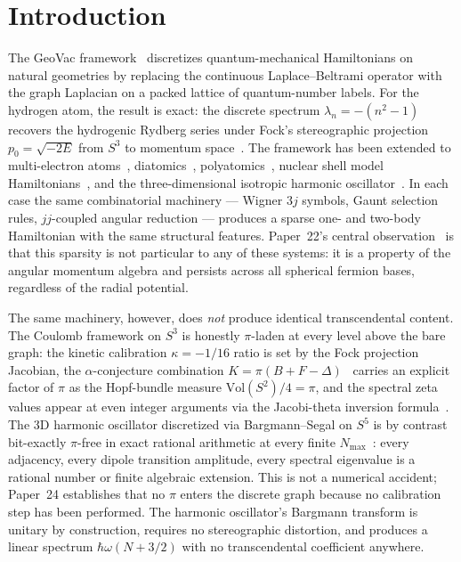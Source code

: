 \documentclass[twocolumn,pra,amsmath,amssymb,superscriptaddress]{revtex4-2}
\begin{document}
\maketitle

\section{Introduction}
\label{sec:intro}

The GeoVac framework~\cite{paper0,paper1,paper7} discretizes
quantum-mechanical Hamiltonians on natural geometries by replacing
the continuous Laplace--Beltrami operator with the graph Laplacian
on a packed lattice of quantum-number labels.  For the hydrogen atom,
the result is exact: the discrete spectrum $\lambda_n = -(n^2 - 1)$
recovers the hydrogenic Rydberg series under Fock's stereographic
projection $p_0 = \sqrt{-2E}$ from $S^3$ to momentum
space~\cite{fock1935,bander_itzykson1966}.  The framework has been
extended to multi-electron atoms~\cite{paper13},
diatomics~\cite{paper11,paper15}, polyatomics~\cite{paper17},
nuclear shell model Hamiltonians~\cite{paper23}, and the
three-dimensional isotropic harmonic oscillator~\cite{paper24}.  In
each case the same combinatorial machinery --- Wigner $3j$ symbols,
Gaunt selection rules, $jj$-coupled angular reduction --- produces a
sparse one- and two-body Hamiltonian with the same structural
features.  Paper~22's central observation~\cite{paper22} is that this
sparsity is not particular to any of these systems: it is a property
of the angular momentum algebra and persists across all spherical
fermion bases, regardless of the radial potential.

The same machinery, however, does \emph{not} produce identical
transcendental content.  The Coulomb framework on $S^3$ is honestly
$\pi$-laden at every level above the bare graph: the kinetic
calibration $\kappa = -1/16$ ratio is set by the Fock projection
Jacobian, the $\alpha$-conjecture combination $K = \pi(B + F -
\Delta)$~\cite{paper2_alpha} carries an explicit factor of $\pi$ as
the Hopf-bundle measure $\mathrm{Vol}(S^2)/4 = \pi$, and the spectral
zeta values appear at even integer arguments via the Jacobi-theta
inversion formula~\cite{paper18,paper28}.  The 3D harmonic oscillator
discretized via Bargmann--Segal on $S^5$ is by contrast bit-exactly
$\pi$-free in exact rational arithmetic at every finite
$N_{\max}$~\cite{paper24}: every adjacency, every dipole transition
amplitude, every spectral eigenvalue is a rational number or finite
algebraic extension.  This is not a numerical accident; Paper~24
establishes that no $\pi$ enters the discrete graph because no
calibration step has been performed.  The harmonic oscillator's
Bargmann transform is unitary by construction, requires no
stereographic distortion, and produces a linear spectrum
$\hbar\omega(N + 3/2)$ with no transcendental coefficient anywhere.
\end{document}
